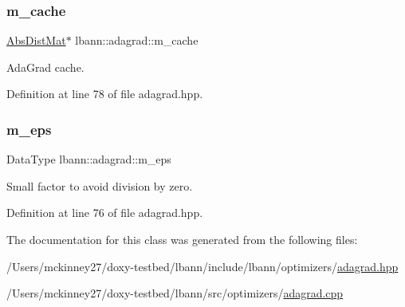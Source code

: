 \subsubsection{\texorpdfstring{m\+\_\+cache}{m\_cache}}
{\footnotesize\ttfamily \hyperlink{base_8hpp_a9a697a504ae84010e7439ffec862b470}{Abs\+Dist\+Mat}$\ast$ lbann\+::adagrad\+::m\+\_\+cache\hspace{0.3cm}{\ttfamily [private]}}

Ada\+Grad cache. 

Definition at line 78 of file adagrad.\+hpp.

\mbox{\label{classlbann_1_1adagrad_aace057f88a46dab327f6409716dbe8de}} 
\subsubsection{\texorpdfstring{m\+\_\+eps}{m\_eps}}
{\footnotesize\ttfamily Data\+Type lbann\+::adagrad\+::m\+\_\+eps\hspace{0.3cm}{\ttfamily [private]}}

Small factor to avoid division by zero. 

Definition at line 76 of file adagrad.\+hpp.



The documentation for this class was generated from the following files\+:\begin{DoxyCompactItemize}
\item 
/\+Users/mckinney27/doxy-\/testbed/lbann/include/lbann/optimizers/\hyperlink{adagrad_8hpp}{adagrad.\+hpp}\item 
/\+Users/mckinney27/doxy-\/testbed/lbann/src/optimizers/\hyperlink{adagrad_8cpp}{adagrad.\+cpp}\end{DoxyCompactItemize}
